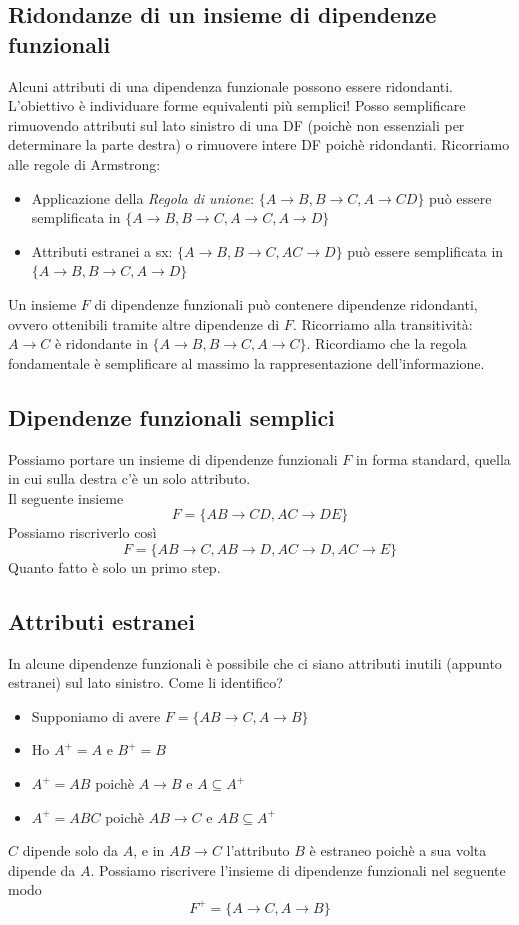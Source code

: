 \subsection{Ridondanze di un insieme di dipendenze funzionali}
Alcuni attributi di una dipendenza funzionale possono essere ridondanti. L'obiettivo è individuare forme equivalenti più semplici! Posso semplificare rimuovendo attributi sul lato sinistro di una DF (poichè non essenziali per determinare la parte destra) o rimuovere intere DF poichè ridondanti. Ricorriamo alle regole di Armstrong:
\begin{itemize}
	\item Applicazione della \emph{Regola di unione}: $\{A \to B, B \to C, A \to CD \}$ può essere semplificata in  $\{A \to B, B \to C, A \to C, A \to D \}$
	\item Attributi estranei a sx:  $\{A \to B, B \to C, AC \to D \}$ può essere semplificata in  $\{A \to B, B \to C, A \to D \}$
\end{itemize}
Un insieme $F$ di dipendenze funzionali può contenere dipendenze ridondanti, ovvero ottenibili tramite altre dipendenze di $F$. Ricorriamo alla transitività: $A \to C$ è ridondante in $\{A \to B, B \to C, \boxed{A \to C}\}$. Ricordiamo che la regola fondamentale è semplificare al massimo la rappresentazione dell'informazione.
\subsection{Dipendenze funzionali semplici}
Possiamo portare un insieme di dipendenze funzionali $F$ in forma standard, quella in cui sulla destra c'è un solo attributo.\\
Il seguente insieme 
\[F=\{AB \to CD, AC \to DE\}\]
Possiamo riscriverlo così
\[F=\{AB \to C, AB \to D, AC \to D, AC \to E\}\]
Quanto fatto è solo un primo step.
\subsection{Attributi estranei}
In alcune dipendenze funzionali è possibile che ci siano attributi inutili (appunto estranei) sul lato sinistro. Come li identifico?
\begin{itemize}
	\item Supponiamo di avere $F = \{AB \to C, A \to B\}$ 
	\item Ho $A^+=A$ e $B^+=B$
	\item $A^+=AB$ poichè $A \to B$ e $A \subseteq A^+$
	\item $A^+=ABC$ poichè $AB \to C$ e $AB \subseteq A^+$
\end{itemize}
$C$ dipende solo da $A$, e in $AB \to C$ l'attributo $B$ è estraneo poichè a sua volta dipende da $A$. Possiamo riscrivere l'insieme di dipendenze funzionali nel seguente modo
\[F^+ = \{ A \to C, A \to B\}\]
